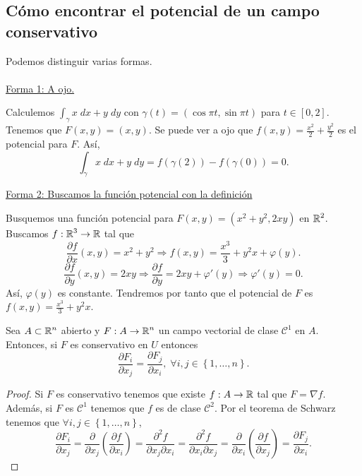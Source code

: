 \subsection*{Cómo encontrar el potencial de un campo conservativo}
Podemos distinguir varias formas. \\
\\
\underline{Forma 1: A ojo.}
\begin{eg}
	Calculemos $\displaystyle \int _{\gamma}x \; dx + y \; dy $ con $\displaystyle \gamma\left(t\right)=\left(\cos \pi t, \sin \pi t\right) $ para $\displaystyle t \in \left[0,2\right]  $. Tenemos que $\displaystyle F\left(x,y\right)=\left(x,y\right) $. Se puede ver a ojo que $\displaystyle f\left(x,y\right)=\frac{x^{2}}{2}+\frac{y^{2}}{2} $ es el potencial para $\displaystyle F $. Así,
	\[\int _{\gamma }x \; dx + y \; dy = f\left(\gamma\left(2\right)\right)-f\left(\gamma\left(0\right)\right) = 0 .\]
\end{eg}
\underline{Forma 2: Buscamos la función potencial con la definición}
\begin{eg}
Busquemos una función potencial para $\displaystyle F\left(x,y\right)=\left(x^{2}+y^{2}, 2xy\right) $ en $\displaystyle \mathbb{R}^{2} $. Buscamos $\displaystyle f: \mathbb{R}^{3}\to \mathbb{R} $ tal que 
\[\frac{\partial f}{\partial x}\left(x,y\right)=x^{2}+y^{2} \Rightarrow f\left(x,y\right)=\frac{x^{3}}{3}+y^{2}x + \varphi\left(y\right) .\]
\[\frac{\partial f}{\partial y}\left(x,y\right)=2xy \Rightarrow \frac{\partial f}{\partial y}=2xy + \varphi'\left(y\right) \Rightarrow \varphi'\left(y\right)=0 .\]
Así, $\displaystyle \varphi\left(y\right) $ es constante. Tendremos por tanto que el potencial de $\displaystyle F $ es $\displaystyle f\left(x,y\right)=\frac{x^{3}}{3}+y^{2}x $. 
\end{eg}
\begin{prop}
Sea $\displaystyle A \subset \mathbb{R}^{n} $ abierto y $\displaystyle F:A \to \mathbb{R}^{n} $ un campo vectorial de clase $\displaystyle \mathcal{C}^{1} $ en $\displaystyle A $. Entonces, si $\displaystyle F $ es conservativo en $\displaystyle U $ entonces
\[\frac{\partial F_{i}}{\partial x_{j}}=\frac{\partial F_{j}}{\partial x_{i}}, \; \forall i,j \in \left\{ 1, \ldots, n\right\}  .\]
\end{prop}
\begin{proof}
	Si $\displaystyle F $ es conservativo tenemos que existe $\displaystyle f: A \to \mathbb{R} $ tal que $\displaystyle F = \nabla f $. Además, si $\displaystyle F $ es $\displaystyle \mathcal{C}^{1} $ tenemos que $\displaystyle f $ es de clase $\displaystyle \mathcal{C}^{2} $. Por el teorema de Schwarz tenemos que $\displaystyle \forall i,j \in \left\{ 1, \ldots, n\right\}  $, 
	\[\frac{\partial F_{i}}{\partial x_{j}}= \frac{\partial }{\partial x_{j}}\left(\frac{\partial f}{\partial x_{i}}\right)=\frac{\partial ^{2}f}{\partial x_{j} \partial x_{i}}=\frac{\partial ^{2}f}{\partial x_{i} \partial x_{j}} = \frac{\partial }{\partial x_{i}}\left(\frac{\partial f}{\partial x_{j}}\right)=\frac{\partial F_{j}}{\partial x_{i}} .\]
\end{proof}
